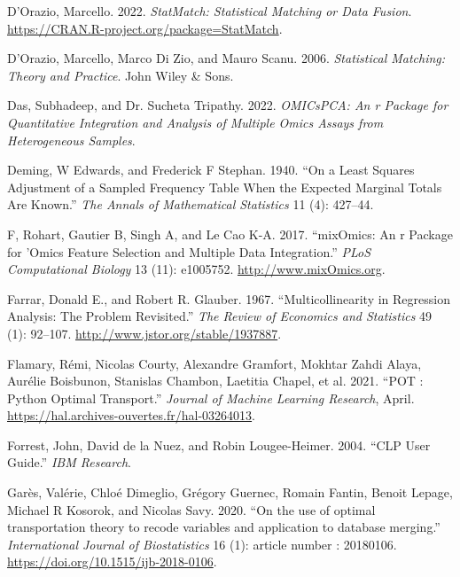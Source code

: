 \begin{CSLReferences}{1}{0}
\leavevmode{}%
D'Orazio, Marcello. 2022. \emph{StatMatch: Statistical Matching or Data Fusion}. \url{https://CRAN.R-project.org/package=StatMatch}.

\leavevmode{}%
D'Orazio, Marcello, Marco Di Zio, and Mauro Scanu. 2006. \emph{Statistical Matching: Theory and Practice}. John Wiley \& Sons.

\leavevmode{}%
Das, Subhadeep, and Dr. Sucheta Tripathy. 2022. \emph{OMICsPCA: An r Package for Quantitative Integration and Analysis of Multiple Omics Assays from Heterogeneous Samples}.

\leavevmode{}%
Deming, W Edwards, and Frederick F Stephan. 1940. {``On a Least Squares Adjustment of a Sampled Frequency Table When the Expected Marginal Totals Are Known.''} \emph{The Annals of Mathematical Statistics} 11 (4): 427--44.

\leavevmode{}%
F, Rohart, Gautier B, Singh A, and Le Cao K-A. 2017. {``mixOmics: An r Package for 'Omics Feature Selection and Multiple Data Integration.''} \emph{PLoS Computational Biology} 13 (11): e1005752. \url{http://www.mixOmics.org}.

\leavevmode{}%
Farrar, Donald E., and Robert R. Glauber. 1967. {``Multicollinearity in Regression Analysis: The Problem Revisited.''} \emph{The Review of Economics and Statistics} 49 (1): 92--107. \url{http://www.jstor.org/stable/1937887}.

\leavevmode{}%
Flamary, Rémi, Nicolas Courty, Alexandre Gramfort, Mokhtar Zahdi Alaya, Aurélie Boisbunon, Stanislas Chambon, Laetitia Chapel, et al. 2021. {``{POT : Python Optimal Transport}.''} \emph{{Journal of Machine Learning Research}}, April. \url{https://hal.archives-ouvertes.fr/hal-03264013}.

\leavevmode{}%
Forrest, John, David de la Nuez, and Robin Lougee-Heimer. 2004. {``CLP User Guide.''} \emph{IBM Research}.

\leavevmode{}%
Garès, Valérie, Chloé Dimeglio, Grégory Guernec, Romain Fantin, Benoit Lepage, Michael R Kosorok, and Nicolas Savy. 2020. {``{On the use of optimal transportation theory to recode variables and application to database merging}.''} \emph{{International Journal of Biostatistics}} 16 (1): article number : 20180106. \url{https://doi.org/10.1515/ijb-2018-0106}.


\end{CSLReferences}
